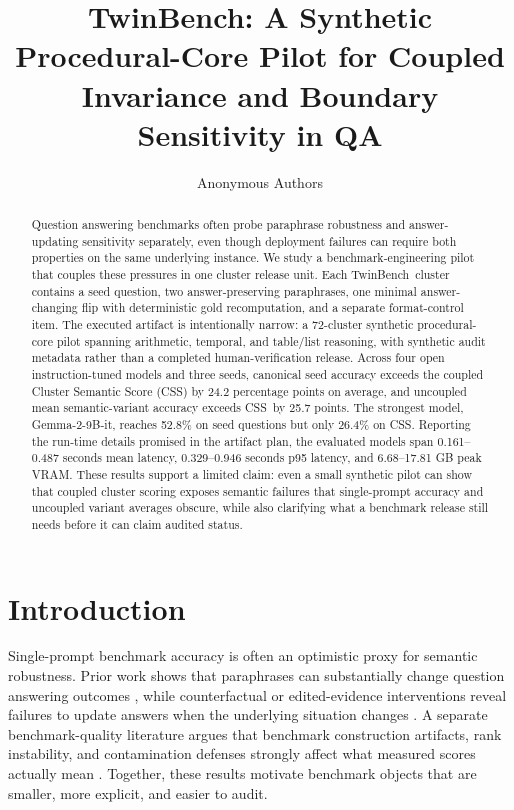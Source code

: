 \documentclass{article}
\title{TwinBench: A Synthetic Procedural-Core Pilot for Coupled Invariance and Boundary Sensitivity in QA}
\author{Anonymous Authors}
\newcommand{\tb}{TwinBench}
\newcommand{\css}{\textsc{CSS}}
\begin{document}
\maketitle

\begin{abstract}
Question answering benchmarks often probe paraphrase robustness and answer-updating sensitivity separately, even though deployment failures can require both properties on the same underlying instance. We study a benchmark-engineering pilot that couples these pressures in one cluster release unit. Each \tb\ cluster contains a seed question, two answer-preserving paraphrases, one minimal answer-changing flip with deterministic gold recomputation, and a separate format-control item. The executed artifact is intentionally narrow: a 72-cluster synthetic procedural-core pilot spanning arithmetic, temporal, and table/list reasoning, with synthetic audit metadata rather than a completed human-verification release. Across four open instruction-tuned models and three seeds, canonical seed accuracy exceeds the coupled Cluster Semantic Score (\css) by 24.2 percentage points on average, and uncoupled mean semantic-variant accuracy exceeds \css\ by 25.7 points. The strongest model, Gemma-2-9B-it, reaches 52.8\% on seed questions but only 26.4\% on \css. Reporting the run-time details promised in the artifact plan, the evaluated models span 0.161--0.487 seconds mean latency, 0.329--0.946 seconds p95 latency, and 6.68--17.81 GB peak VRAM. These results support a limited claim: even a small synthetic pilot can show that coupled cluster scoring exposes semantic failures that single-prompt accuracy and uncoupled variant averages obscure, while also clarifying what a benchmark release still needs before it can claim audited status.
\end{abstract}

\section{Introduction}

Single-prompt benchmark accuracy is often an optimistic proxy for semantic robustness. Prior work shows that paraphrases can substantially change question answering outcomes \citep{choi2025roparqparaphraseawarealignmentlarge,lunardi2025robustnessreliabilitybenchmarkbasedevaluation,rabinovich-etal-2023-predicting}, while counterfactual or edited-evidence interventions reveal failures to update answers when the underlying situation changes \citep{chen2025counterbench,zhong-etal-2023-mquake,fang-etal-2025-lastingbench}. A separate benchmark-quality literature argues that benchmark construction artifacts, rank instability, and contamination defenses strongly affect what measured scores actually mean \citep{vendrow2025largelanguagemodelbenchmarks,reuel2024betterbenchassessingaibenchmarks,alzahrani2024benchmarkstargetsrevealingsensitivity,qian2026benchmark2systematicevaluationllm}. Together, these results motivate benchmark objects that are smaller, more explicit, and easier to audit.
\end{document}
